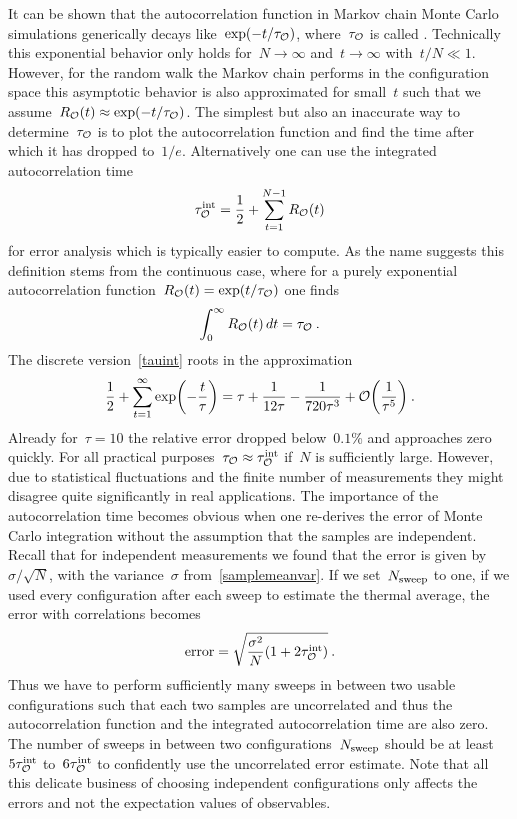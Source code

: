 It can be shown that the autocorrelation function in Markov chain Monte Carlo
simulations generically decays like~$\exp(-t/\tau_{\mathcal{O}})$, where~$\tau_{\mathcal{O}}$ is
called . Technically this exponential behavior
only holds for~$N \to \infty$ and~$t \to \infty$ with~$t/N \ll 1$. However, for
the random walk the Markov chain performs in the configuration space this
asymptotic behavior is also approximated for small~$t$ such that we
assume~$R_{\mathcal{O}}(t) \approx \exp(-t/\tau_{\mathcal{O}})$. The simplest but also an
inaccurate way to determine~$\tau_{\mathcal{O}}$ is to plot the autocorrelation function
and find the time after which it has dropped to~$1/e$. Alternatively one can
use the integrated autocorrelation time
%
\begin{equation}\label{tauint}
  \tau^{\mathrm{int}}_{\mathcal{O}} = \frac{1}{2} + \sum_{t=1}^{N-1} R_{\mathcal{O}}(t)
\end{equation}
%
for error analysis which is typically easier to compute. As the name suggests
this definition stems from the continuous case, where for a purely exponential
autocorrelation function~$R_{\mathcal{O}}(t) = \exp(t/\tau_{\mathcal{O}})$ one finds
%
\begin{equation}
  \int_0^{\infty} R_{\mathcal{O}}(t) \,dt = \tau_{\mathcal{O}}\:.
\end{equation}
%
The discrete version~\eqref{tauint} roots in the approximation
%
\begin{equation}
  \frac{1}{2} + \sum_{t=1}^{\infty} \exp \biggl( - \frac{t}{\tau} \biggr) =
    \tau + \frac{1}{12 \tau} - \frac{1}{720 \tau^3} +
    \mathcal{O}\biggl( \frac{1}{\tau^5} \biggr)\:.
\end{equation}
%
Already for~$\tau = 10$ the relative error dropped below~$0.1$\% and approaches
zero quickly.  For all practical purposes~$\tau_{\mathcal{O}} \approx \tau^{\mathrm{int}}_{\mathcal{O}}$
if~$N$ is sufficiently large. However, due to statistical fluctuations and the
finite number of measurements they might disagree quite significantly in real
applications. The importance of the autocorrelation time becomes obvious when
one re-derives the error of Monte Carlo integration without the assumption that
the samples are independent. Recall that for independent measurements we found
that the error is given by~$\sigma/\sqrt{N}$, with the variance~$\sigma$
from~\eqref{samplemeanvar}. If we set~$N_{\mathrm{sweep}}$ to one, \ie{} if we used every
configuration after each sweep to estimate the thermal average, the error with
correlations becomes
%
\begin{equation}\label{correrror}
  \text{error} = \sqrt{\frac{\sigma^2}{N}(1 + 2\tau^{\mathrm{int}}_{\mathcal{O}})}\:.
\end{equation}
%
Thus we have to perform sufficiently many sweeps in between two usable
configurations such that each two samples are uncorrelated and thus the
autocorrelation function and the integrated autocorrelation time are also zero.
The number of sweeps in between two configurations~$N_{\mathrm{sweep}}$ should be at
least~$5 \tau^{\mathrm{int}}_{\mathcal{O}}$ to~$6 \tau^{\mathrm{int}}_{\mathcal{O}}$ to confidently use the uncorrelated
error estimate. Note that all this delicate business of choosing independent
configurations only affects the errors and not the expectation values of
observables.

